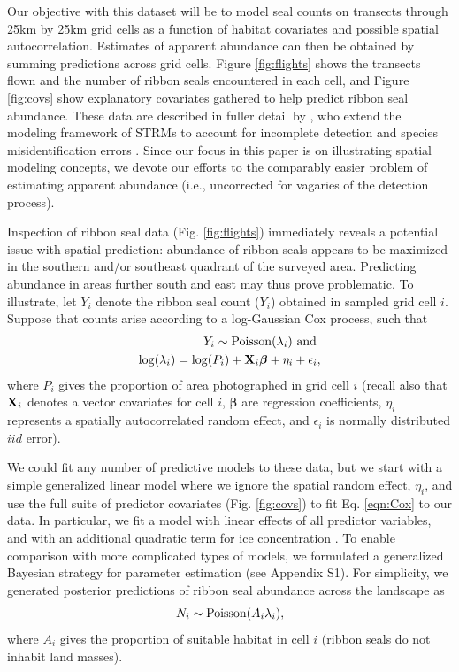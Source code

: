 \documentclass[12pt,english]{article}
\begin{document}
\begin{spacing}{1.9}
Our objective with this dataset will be to model seal counts on transects through 25km by 25km grid cells as a function of habitat covariates and possible spatial autocorrelation. Estimates of apparent abundance can then be obtained by summing predictions across grid cells. Figure \ref{fig:flights} shows the transects flown and the number of ribbon seals encountered in each cell, and Figure \ref{fig:covs} show explanatory covariates gathered to help predict ribbon seal abundance.  These data are described in fuller detail by \citet{ConnEtAl2014}, who extend the modeling framework of STRMs to account for incomplete detection and species misidentification errors \citep[see e.g.][]{ConnEtAl2014}.  Since our focus in this paper is on illustrating spatial modeling concepts, we devote our efforts to the comparably easier problem of estimating apparent abundance (i.e., uncorrected for vagaries of the detection process).

Inspection of ribbon seal data (Fig. \ref{fig:flights}) immediately reveals a potential
issue with spatial prediction: abundance of ribbon seals appears to be maximized in the southern and/or southeast quadrant of the surveyed area.  Predicting abundance in areas further south and east may thus prove problematic.  To illustrate, let $Y_i$ denote the ribbon seal count ($Y_i$) obtained in sampled grid cell $i$.  Suppose that counts arise according to a log-Gaussian Cox process, such that
\begin{eqnarray}
  \label{eqn:Cox}
  Y_i \sim {\rm Poisson}(\lambda_i) \mbox{ and } \\
  \log(\lambda_i) = \log(P_i) + {\bf X}_i \boldsymbol{\beta} + \eta_i + \epsilon_i, \nonumber
\end{eqnarray}
where $P_i$ gives the proportion of area photographed in grid cell $i$ (recall also that ${\bf X}_i$ denotes a vector covariates for cell $i$, $\boldsymbol{\beta}$ are regression coefficients, $\eta_i$ represents a spatially autocorrelated random effect, and $\epsilon_i$ is normally distributed $iid$ error).

We could fit any number of predictive models to these data, but we start with a simple
generalized linear model where we ignore the spatial random effect, $\eta_i$, and use the full suite of predictor covariates (Fig. \ref{fig:covs}) to fit Eq. \ref{eqn:Cox} to our data. In particular, we fit a model with linear effects of all predictor variables, and with an additional quadratic term for ice concentration \citep[seal density is often maximized at an intermediate value of ice concentration; see][]{VerHoef2013,ConnEtAl2014}. To enable comparison with more complicated types of models, we formulated a generalized Bayesian strategy for parameter estimation (see Appendix S1).  For simplicity, we generated posterior predictions of ribbon seal abundance across the landscape as
\begin{equation}
  N_i \sim {\rm Poisson}(A_i \lambda_i),
\end{equation}
where $A_i$ gives the proportion of suitable habitat in cell $i$ (ribbon seals do not inhabit land masses).


\end{spacing}
\end{document}
